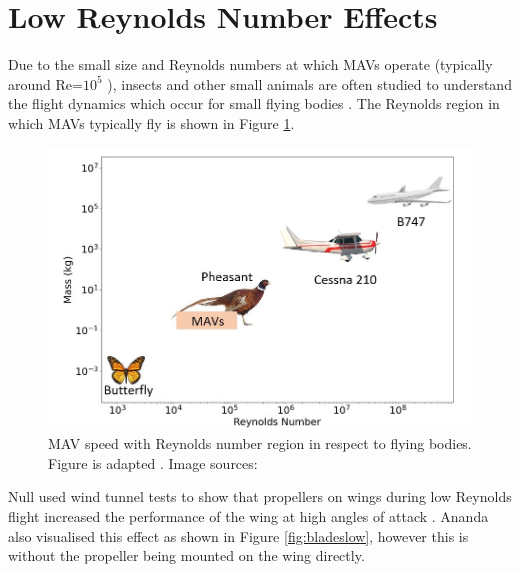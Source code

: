 \section{Low Reynolds Number Effects }\label{sec:Reynolds2}

\label{sec:LowReynolds}
Due to the small size and Reynolds numbers at which \acrshort{MAV}s operate (typically around Re=$10^5$ \cite{Huq2009} \cite{Winslow2018}), insects and other small animals are often studied to understand the flight dynamics which occur for small flying bodies \cite{Liu2009}. The Reynolds region in which \acrshort{MAV}s typically fly is shown in Figure \ref{fig:MAVsizes}.

\begin{figure}[H]
  \centering
  \includegraphics[width=\linewidth]{03_LiteratureReview/Figs/Reynolds.JPG}
  \caption{\acrshort{MAV} speed with Reynolds number region in respect to flying bodies. Figure is adapted \cite{reynoldsFigure}. Image sources: \cite{butterfly, pheasant, cess, b474} }
  \label{fig:MAVsizes}
\end{figure}

 Null used wind tunnel tests to show that propellers on wings during low Reynolds flight increased the performance of the wing at high angles of attack \cite{Null2005}. Ananda also visualised this effect as shown in Figure \ref{fig:bladeslow}, however this is without the propeller being mounted on the wing directly.  

